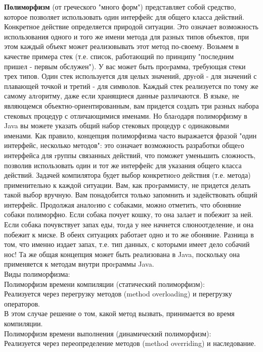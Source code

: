 \textbf{Полиморфизм} (от греческого "много форм") представляет собой средство, которое позволяет использовать один интерфейс для общего класса действий. Конкретное действие определяется природой ситуации. Это означает возможность использования одного и того же имени метода для разных типов объектов, при этом каждый объект может реализовывать этот метод по-своему. Возьмем в качестве примера стек (т.е. список, работающий по принципу "последним пришел - первым обслужен"). У вас может быть проrрамма, требующая стеки трех типов. Один стек используется для целых значений, друrой - для значений с плавающей точкой и третий - для символов. Каждый стек реализуется по тому же самому алrоритму, даже если хранящиеся данные различаются. В языке, не являющемся объектно-ориентированным, вам придется создать три разных набора стековых процедур с отличающимися именами. Но блаrодаря полиморфизму в Java вы можете указать общий набор стековых процедур с одинаковыми именами. Как правило, концепция полиморфизма часто выражается фразой "один интерфейс, несколько методов": это означает возможность разработки общеrо интерфейса для rруппы связанных действий, что поможет уменьшить сложность, позволив использовать один и тот же интерфейс для указания общего класса действий. Задачей компилятора будет выбор конкретноrо действия (т.е. метода) применительно к каждой ситуации. Вам, как проrраммисту, не придется делать такой выбор вручную. Вам понадобится только запомнить и задействовать общий интерфейс. Продолжая аналоrию с собаками, можно отметить, что обоняние собаки полиморфно. Если собака почует кошку, то она залает и побежит за ней. Если собака почувствует запах еды, тоrда у нее начнется слюноотделение, и она побежит к миске. В обеих ситуациях работает одно и то же обоняние. Разница в том, что именно издает запах, т.е. тип данных, с которыми имеет дело собачий нос! Та же общая концепция может быть реализована в Java, поскольку
она применяется к методам внутри проrраммы Java. \\
Виды полиморфизма: \\
Полиморфизм времени компиляции (статический полиморфизм): \\
Реализуется через перегрузку методов (method overloading) и перегрузку операторов. \\
В этом случае решение о том, какой метод вызвать, принимается во время компиляции. \\
Полиморфизм времени выполнения (динамический полиморфизм): \\
Реализуется через переопределение методов (method overriding) и наследование. \\
